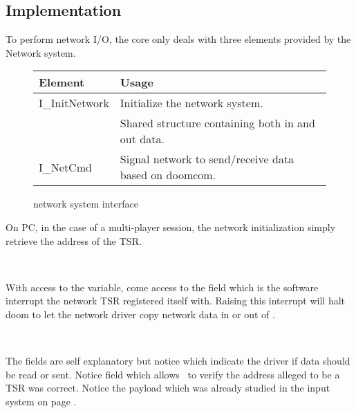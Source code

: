 \subsection{Implementation}
To perform network I/O, the core only deals with three elements provided by the Network system.\\
\par
 \begin{figure}[H]
\centering  
\begin{tabularx}{\textwidth}{ L{0.6}  L{1.4}}
  \toprule
  \textbf{Element} &  \textbf{Usage}\\

  \toprule 
   I\_InitNetwork & Initialize the network system.\\
    & Shared structure containing both in and out data.\\
   I\_NetCmd & Signal network to send/receive data based on doomcom.\\
   \toprule
\end{tabularx}
\caption{\doom network system interface}
\end{figure}



On PC, in the case of a multi-player session, the network initialization simply retrieve the address of the TSR.\\
\par
{}\\
\par
With access to the  variable, come access to the field  which is the software interrupt the network TSR registered itself with. Raising this interrupt will halt doom to let the network driver copy network data in or out of .



 \label{doomcom_t.c} \\
\par
The fields are self explanatory but notice  which indicate the driver if data should be read or sent. Notice field  which allows \doom~to verify the address alleged to be a TSR was correct. Notice the  payload which was already studied in the input system on page \pageref{cmd_t_type}.\\
\pagebreak



